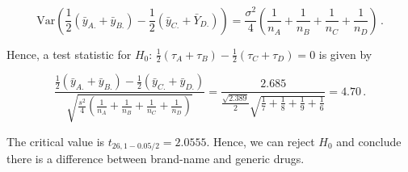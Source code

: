 \documentclass[
]{book}
\theoremstyle{definition}
\theoremstyle{definition}
\theoremstyle{definition}
\theoremstyle{definition}
\theoremstyle{remark}
\begin{document}
\begin{enumerate}
  \[\mbox{Var}\left(\frac{1}{2}(\bar{y}_{A.}+\bar{y}_{B.}) - \frac{1}{2}(\bar{y}_{C.}+\bar{Y}_{D.})\right) = \frac{\sigma^2}{4}\left(\frac{1}{n_A} + \frac{1}{n_B} + \frac{1}{n_C} + \frac{1}{n_D}\right)\,.\]

  Hence, a test statistic for \(H_0:\, \frac{1}{2}(\tau_A+\tau_B) - \frac{1}{2}(\tau_C+\tau_D)=0\) is given by

  \[
  \frac{\frac{1}{2}(\bar{y}_{A.}+\bar{y}_{B.}) - \frac{1}{2}(\bar{y}_{C.}+\bar{y}_{D.})}{\sqrt{\frac{s^2}{4}\left(\frac{1}{n_A} + \frac{1}{n_B} + \frac{1}{n_C} + \frac{1}{n_D}\right)}} = \frac{2.685}{\frac{\sqrt{2.389}}{2}\sqrt{\frac{1}{7} + \frac{1}{8} + \frac{1}{9} + \frac{1}{6}}} = 4.70\,.
   \]

  The critical value is \(t_{26, 1-0.05/2} = 2.0555\). Hence, we can reject \(H_0\) and conclude there is a difference between brand-name and generic drugs.
\end{enumerate}
\end{document}

